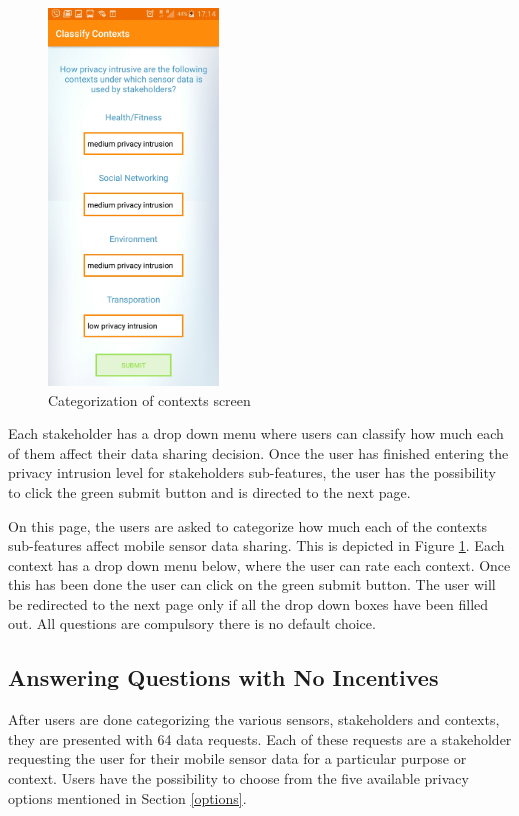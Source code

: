 \begin{figure}[ht!]
\centering
\includegraphics[width=0.4\linewidth, height=10cm]{./images/cat_contexts}
\caption{Categorization of contexts screen}
\label{fig:cat_co}
\end{figure}

Each stakeholder has a drop
down menu where users can classify how much each of them affect their data sharing decision.
Once the user has finished entering the privacy intrusion level for stakeholders sub-features, the user has the possibility to click the green submit button and is directed to the next page.


On this page, the users are asked to categorize how much each of the contexts sub-features affect mobile sensor data sharing. This is depicted in Figure \ref{fig:cat_co}. Each context has a drop down menu below, where the user can rate each context. Once this has been done the user can click on the green submit button. The user will be redirected to the next page only if all the drop down boxes have been filled out. All questions are compulsory there is no default choice.

\subsection{Answering Questions with No Incentives}  \label{quest_wi}
After users are done categorizing the various sensors, stakeholders and contexts, they are presented with 64 data requests. Each of these requests are a stakeholder requesting the user for their mobile sensor data for a particular purpose or context. Users have the possibility to choose from the five available privacy options mentioned in Section \ref{options}. 

